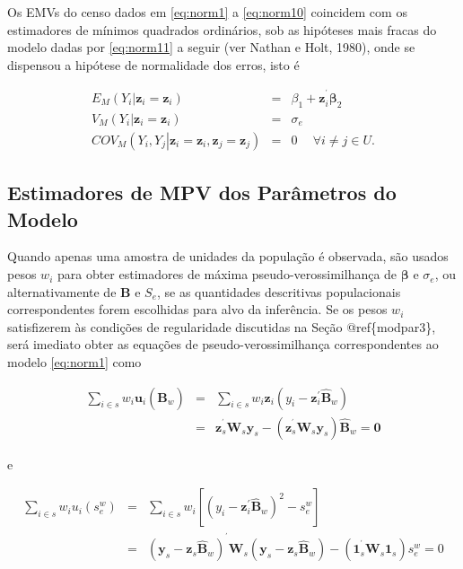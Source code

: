 \documentclass[]{book}
\begin{document}
Os EMVs do censo dados em \eqref{eq:norm1} a \eqref{eq:norm10} coincidem com
os estimadores de mínimos quadrados ordinários, sob as hipóteses mais
fracas do modelo dadas por \eqref{eq:norm11} a seguir (ver Nathan e Holt,
1980), onde se dispensou a hipótese de normalidade dos erros, isto é

\begin{eqnarray}
E_{M}\left( \left. Y_{i}\right| \mathbf{z}_{i}=\mathbf{z}_{i}\right)
&=&\beta _{1}+\mathbf{z}_{i}^{^{\prime }}\mathbf{\beta }_{2}  \label{eq:norm11} \\
V_{M}\left( \left. Y_{i}\right| \mathbf{z}_{i}=\mathbf{z}_{i}\right)
&=&\sigma _{e}  \nonumber \\
COV_{M}\left( \left. Y_{i},Y_{j}\right| \mathbf{z}_{i}=\mathbf{z}_{i},
\mathbf{z}_{j}=\mathbf{z}_{j}\right) &=&0\ \quad \forall i\neq j\in U. 
\nonumber
\end{eqnarray}

\subsection{Estimadores de MPV dos Parâmetros do
Modelo}\label{estimadores-de-mpv-dos-parametros-do-modelo}

Quando apenas uma amostra de unidades da população é observada, são
usados pesos \(w_{i}\) para obter estimadores de máxima
pseudo-verossimilhança de \(\mathbf{\beta }\) e \(\sigma _{e}\), ou
alternativamente de \(\mathbf{B}\) e \(S_{e}\), se as quantidades
descritivas populacionais correspondentes forem escolhidas para alvo da
inferência. Se os pesos \(w_{i}\) satisfizerem às condições de
regularidade discutidas na Seção @ref\{modpar3\}, será imediato obter as
equações de pseudo-verossimilhança correspondentes ao modelo
\eqref{eq:norm1} como

\begin{eqnarray}
\sum\limits_{i\in s}w_{i}\mathbf{u}_{i}\left( \mathbf{\hat{B}}_{w}\right)
&=&\sum\limits_{i\in s}w_{i}\mathbf{z}_{i}\left( y_{i}-\mathbf{z}
_{i}^{\prime }\mathbf{\hat{B}}_{w}\right)  \label{eq:norm12} \\
&=&\mathbf{z}_{s}^{^{\prime }}\mathbf{W}_{s}\mathbf{y}_{s}-\left( \mathbf{z}
_{s}^{^{\prime }}\mathbf{W}_{s}\mathbf{y}_{s}\right) \mathbf{\hat{B}}_{w}=
\mathbf{0}  \nonumber
\end{eqnarray}

e

\begin{eqnarray}
\sum\limits_{i\in s}w_{i}u_{i}\left( s_{e}^{w}\right) &=&\sum\limits_{i\in
s}w_{i}\left[ \left( y_{i}-\mathbf{z}_{i}^{\prime }\mathbf{\hat{B}}
_{w}\right) ^{2}-s_{e}^{w}\right]  \label{eq:norm13} \\
&=&\left( \mathbf{y}_{s}-\mathbf{z}_{s}\mathbf{\hat{B}}_{w}\right)
^{^{\prime }}\mathbf{W}_{s}\left( \mathbf{y}_{s}-\mathbf{z}_{s}\mathbf{\hat{B
}}_{w}\right) -\left( \mathbf{1}_{s}^{^{\prime }}\mathbf{W}_{s}\mathbf{1}
_{s}\right) s_{e}^{w}=0  \nonumber
\end{eqnarray}
\end{document}
